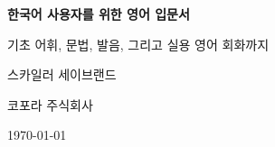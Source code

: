 \begin{titlepage}
    \centering
    \vspace*{1in}
    {\Huge\bfseries 한국어 사용자를 위한 영어 입문서\par}
    {\Large 기초 어휘, 문법, 발음, 그리고 실용 영어 회화까지\par}
    \vspace{1in}
    {\Large 스카일러 세이브랜드\par}
    {\Large 코포라 주식회사\par}
    \vfill
    {\large \today\par}
\end{titlepage}
